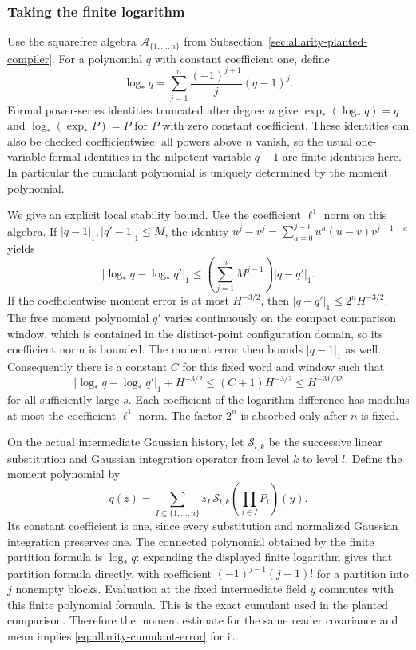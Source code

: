 \subsubsection{Taking the finite logarithm}

Use the squarefree algebra $\mathscr A_{\{1,\ldots,n\}}$ from
Subsection~\ref{sec:allarity-planted-compiler}. For a polynomial $q$ with
constant coefficient one, define
\[
 \log_*q=\sum_{j=1}^n\frac{(-1)^{j+1}}j(q-1)^j.
\]
Formal power-series identities truncated after degree $n$ give
$\exp_*(\log_*q)=q$ and $\log_*(\exp_*P)=P$ for $P$ with zero
constant coefficient. These identities can also be checked coefficientwise:
all powers above $n$ vanish, so the usual one-variable formal identities
in the nilpotent variable $q-1$ are finite identities here. In particular
the cumulant polynomial is uniquely determined by the moment polynomial.

We give an explicit local stability bound. Use the coefficient
$\ell^1$ norm on this algebra. If $|q-1|_1,|q'-1|_1\le M$, the
identity $u^j-v^j=\sum_{a=0}^{j-1}u^a(u-v)v^{j-1-a}$ yields
\[
 |\log_*q-\log_*q'|_1
 \le\left(\sum_{j=1}^n M^{j-1}\right)|q-q'|_1.
\]
If the coefficientwise moment error is at most $H^{-3/2}$, then
$|q-q'|_1\le2^nH^{-3/2}$. The free moment polynomial $q'$ varies
continuously on the compact comparison window, which is contained in
the distinct-point configuration domain, so its coefficient norm
is bounded. The moment error then bounds $|q-1|_1$ as well. Consequently
there is a constant $C$ for this fixed word and window such that
\begin{equation}\label{eq:allarity-cumulant-error}
 |\log_*q-\log_*q'|_1+H^{-3/2}
                  \le(C+1)H^{-3/2}\le H^{-31/32}
\end{equation}
for all sufficiently large $s$. Each coefficient of the logarithm
difference has modulus at most the coefficient $\ell^1$ norm. The
factor $2^n$ is absorbed only after $n$ is fixed.

On the actual intermediate Gaussian history, let $\mathcal S_{l,k}$
be the successive linear substitution and Gaussian integration operator
from level $k$ to level $l$. Define the moment polynomial by
\[
 q(z)=\sum_{I\subseteq\{1,\ldots,n\}}z_I\,
      \mathcal S_{l,k}\left(\prod_{i\in I}P_i\right)(y).
\]
Its constant coefficient is one, since every substitution and normalized
Gaussian integration preserves one. The connected polynomial obtained by
the finite partition formula is $\log_*q$: expanding the displayed
finite logarithm gives that partition formula directly, with coefficient
$(-1)^{j-1}(j-1)!$ for a partition into $j$ nonempty blocks.
Evaluation at the fixed intermediate field $y$ commutes with this finite
polynomial formula. This is the exact cumulant used in the planted
comparison. Therefore the moment estimate for the same reader
covariance and mean implies \eqref{eq:allarity-cumulant-error} for it.

